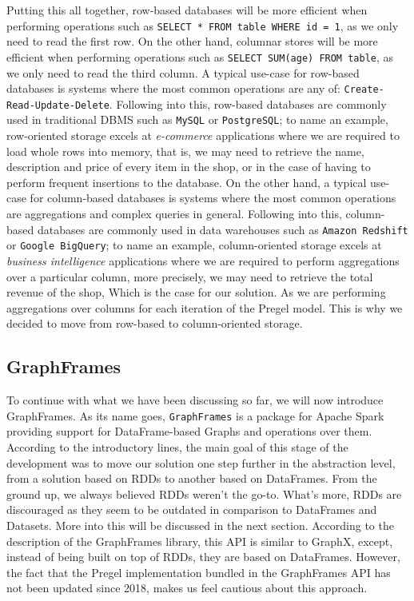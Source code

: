 Putting this all together, row-based databases will be more efficient when performing operations such as \texttt{SELECT * FROM table WHERE id = 1}, as we only need to read the first row. On the other hand, columnar stores will be more efficient when performing operations such as \texttt{SELECT SUM(age) FROM table}, as we only need to read the third column. A typical use-case for row-based databases is systems where the most common operations are any of: \texttt{Create-Read-Update-Delete}. Following into this, row-based databases are commonly used in traditional DBMS such as \texttt{MySQL} or \texttt{PostgreSQL}; to name an example, row-oriented storage excels at \textit{e-commerce} applications where we are required to load whole rows into memory, that is, we may need to retrieve the name, description and price of every item in the shop, or in the case of having to perform frequent insertions to the database. On the other hand, a typical use-case for column-based databases is systems where the most common operations are aggregations and complex queries in general. Following into this, column-based databases are commonly used in data warehouses such as \texttt{Amazon Redshift} or \texttt{Google BigQuery}; to name an example, column-oriented storage excels at \textit{business intelligence} applications where we are required to perform aggregations over a particular column, more precisely, we may need to retrieve the total revenue of the shop, Which is the case for our solution. As we are performing aggregations over columns for each iteration of the Pregel model. This is why we decided to move from row-based to column-oriented storage.

\subsection{GraphFrames}

To continue with what we have been discussing so far, we will now introduce GraphFrames. As its name goes, \texttt{GraphFrames} is a package for Apache Spark providing support for DataFrame-based Graphs and operations over them. According to the introductory lines, the main goal of this stage of the development was to move our solution one step further in the abstraction level, from a solution based on RDDs to another based on DataFrames. From the ground up, we always believed RDDs weren't the go-to. What's more, RDDs are discouraged as they seem to be outdated in comparison to DataFrames and Datasets. More into this will be discussed in the next section. According to the description of the GraphFrames library, this API is similar to GraphX, except, instead of being built on top of RDDs, they are based on DataFrames. However, the fact that the Pregel implementation bundled in the GraphFrames API  has not been updated since 2018, makes us feel cautious about this approach.

